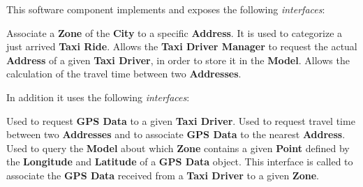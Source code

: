 \begin{itemize}
\begin{itemize}
		This software component implements and exposes the following \textit{interfaces}:
		\begin{itemize}
			 Associate a \textbf{Zone} of the \textbf{City} to a specific \textbf{Address}. It is used to categorize a just arrived \textbf{Taxi Ride}.
			 Allows the \textbf{Taxi Driver Manager} to request the actual \textbf{Address} of a given \textbf{Taxi Driver}, in order to store it in the \textbf{Model}.
			 Allows the calculation of the travel time between two \textbf{Addresses}.
		\end{itemize}
		In addition it uses the following \textit{interfaces}:
		\begin{itemize}
			 Used to request \textbf{GPS Data} to a given \textbf{Taxi Driver}.
			 Used to request travel time between two \textbf{Addresses} and to associate \textbf{GPS Data} to the nearest \textbf{Address}.
			 Used to query the \textbf{Model} about which \textbf{Zone} contains a given \textbf{Point} defined by the \textbf{Longitude} and \textbf{Latitude} of a \textbf{GPS Data} object.
			This interface is called to associate the \textbf{GPS Data} received from a \textbf{Taxi Driver} to a given \textbf{Zone}.
		\end{itemize}
		

\end{itemize}
\end{itemize}

